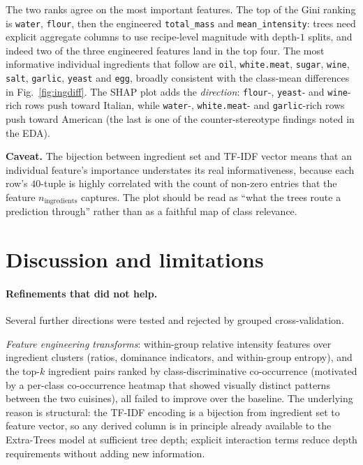 \documentclass[11pt,a4paper]{article}
\begin{document}
The two ranks agree on the most important features. The
top of the Gini ranking is \texttt{water}, \texttt{flour}, then the engineered
\texttt{total\_mass} and \texttt{mean\_intensity}: trees need explicit aggregate columns
to use recipe-level magnitude with depth-$1$ splits, and indeed two of the three
engineered features land in the top four. The most informative individual ingredients
that follow are \texttt{oil}, \texttt{white.meat}, \texttt{sugar}, \texttt{wine},
\texttt{salt}, \texttt{garlic}, \texttt{yeast} and \texttt{egg}, broadly consistent with
the class-mean differences in Fig.~\ref{fig:ingdiff}. The SHAP plot adds the
\emph{direction}: \texttt{flour}-, \texttt{yeast}- and \texttt{wine}-rich rows push toward
Italian, while \texttt{water}-, \texttt{white.meat}- and \texttt{garlic}-rich rows push
toward American (the last is one of the counter-stereotype findings noted in the EDA).

\textbf{Caveat.} The bijection between ingredient set and TF-IDF vector means that an
individual feature's importance understates its real informativeness, because each row's
$40$-tuple is highly correlated with the count of non-zero entries that the feature
$n_{\mathrm{ingredients}}$ captures. The plot should be read as ``what the trees route a prediction
through'' rather than as a faithful map of class relevance.

\section{Discussion and limitations}

\paragraph{Refinements that did not help.} Several further directions were tested and
rejected by grouped cross-validation.

 \textit{Feature engineering transforms}: within-group relative intensity features over
ingredient clusters (ratios, dominance indicators, and within-group entropy), and the
top-$k$ ingredient pairs ranked by class-discriminative co-occurrence (motivated by a
per-class co-occurrence heatmap that showed visually distinct patterns between the two
cuisines), all failed to improve over the baseline. The underlying reason is structural: the TF-IDF encoding is
a bijection from ingredient set to feature vector, so any derived column is in principle
already available to the Extra-Trees model at sufficient tree depth; explicit interaction
terms reduce depth requirements without adding new information. 
\end{document}
